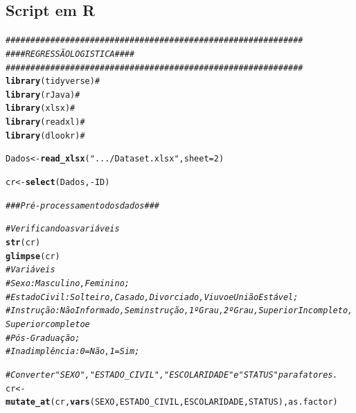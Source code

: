 \documentclass[
	12pt,				%
	openright,			%
	oneside,      %
	a4paper,			%
	english,			%
	french,				%
	spanish,			%
	brazil,				%
	]{abntex2}\usepackage[]{graphicx}\usepackage[table]{xcolor}
\makeatletter
\newcommand{\hlnum}[1]{\textcolor[rgb]{0.686,0.059,0.569}{#1}}%
\newcommand{\hlstr}[1]{\textcolor[rgb]{0.192,0.494,0.8}{#1}}%
\newcommand{\hlcom}[1]{\textcolor[rgb]{0.678,0.584,0.686}{\textit{#1}}}%
\newcommand{\hlopt}[1]{\textcolor[rgb]{0,0,0}{#1}}%
\newcommand{\hlstd}[1]{\textcolor[rgb]{0.345,0.345,0.345}{#1}}%
\newcommand{\hlkwb}[1]{\textcolor[rgb]{0.69,0.353,0.396}{#1}}%
\newcommand{\hlkwc}[1]{\textcolor[rgb]{0.333,0.667,0.333}{#1}}%
\newcommand{\hlkwd}[1]{\textcolor[rgb]{0.737,0.353,0.396}{\textbf{#1}}}%
\newenvironment{kframe}{%
 \def\at@end@of@kframe{}%
 \ifinner\ifhmode%
  \def\at@end@of@kframe{\end{minipage}}%
  \begin{minipage}{\columnwidth}%
 \fi\fi%
 \def\FrameCommand##1{\hskip\@totalleftmargin \hskip-\fboxsep
 \colorbox{shadecolor}{##1}\hskip-\fboxsep
     \hskip-\linewidth \hskip-\@totalleftmargin \hskip\columnwidth}%
 \MakeFramed {\advance\hsize-\width
   \@totalleftmargin\z@ \linewidth\hsize
   \@setminipage}}%
 {\par\unskip\endMakeFramed%
 \at@end@of@kframe}
\newenvironment{knitrout}{}{} %
\theoremstyle{definition}
\makeatother
\begin{document}
\begin{apendicesenv}
\chapter{Script em R}
\begin{knitrout}\tiny
{}\color{fgcolor}\begin{kframe}
\begin{alltt}
\hlcom{############################################################}
\hlcom{####                 REGRESSÃO LOGISTICA                ####}
\hlcom{############################################################}
\hlkwd{library}\hlstd{(tidyverse)}  \hlcom{#}
\hlkwd{library}\hlstd{(rJava)}      \hlcom{#}
\hlkwd{library}\hlstd{(xlsx)}       \hlcom{#}
\hlkwd{library}\hlstd{(readxl)}     \hlcom{#}
\hlkwd{library}\hlstd{(dlookr)}     \hlcom{#}


\hlstd{Dados} \hlkwb{<-} \hlkwd{read_xlsx}\hlstd{(}\hlstr{".../Dataset.xlsx"}\hlstd{,} \hlkwc{sheet} \hlstd{=} \hlnum{2}\hlstd{)}


\hlstd{cr} \hlkwb{<-} \hlkwd{select}\hlstd{(Dados,} \hlopt{-}\hlstd{ID)}

\hlcom{### Pré-processamento dos dados ###}

\hlcom{# Verificando as variáveis}
\hlkwd{str}\hlstd{(cr)}
\hlkwd{glimpse}\hlstd{(cr)}
  \hlcom{# Variáveis}
\hlcom{# Sexo:  Masculino,  Feminino;}
\hlcom{# Estado Civil: Solteiro, Casado, Divorciado, Viuvo e União Estável;}
\hlcom{# Instrução: Não Informado, Sem instrução, 1º Grau, 2º Grau, Superior Incompleto, Superior completo e }
\hlcom{# Pós-Graduação;}
\hlcom{# Inadimplência: 0 = Não, 1 = Sim;}


\hlcom{# Converter "SEXO","ESTADO_CIVIL","ESCOLARIDADE" e "STATUS" para fatores.}
\hlstd{cr} \hlkwb{<-} \hlkwd{mutate_at}\hlstd{(cr,} \hlkwd{vars}\hlstd{(SEXO, ESTADO_CIVIL, ESCOLARIDADE, STATUS), as.factor)}
\end{alltt}
\end{kframe}
\end{knitrout}

\end{apendicesenv}
\end{document}
